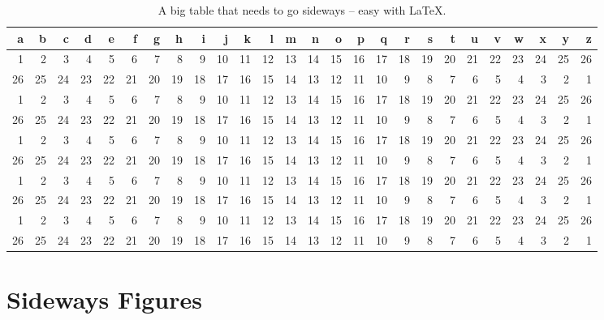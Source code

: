 \begin{table}
  \caption{\label{tbl:sidewaysT}A big table that needs to go
   sideways -- easy with \LaTeX.}

  \vspace{2ex}
  \renewcommand{\arraystretch}{1.2}
  \begin{tabular*}{\textwidth}{@{\extracolsep{\fill}}*{26}{r}}
    \hline\hline
    a & b & c & d & e & f & g & h & i & j & k & l & m & n & o &
     p & q & r & s & t & u & v & w & x & y & z
    \\ \hline
    1 & 2 & 3 & 4 & 5 & 6 & 7 & 8 & 9 &
    10 & 11 & 12 & 13 & 14 & 15 & 16 & 17 & 18 & 19 &
    20 & 21 & 22 & 23 & 24 & 25 & 26 \\
    26 & 25 & 24 & 23 & 22 & 21 & 20 &
    19 & 18 & 17 & 16 & 15 & 14 & 13 & 12 & 11 & 10 &
    9 & 8 & 7 & 6 & 5 & 4 & 3 & 2 & 1 \\
    1 & 2 & 3 & 4 & 5 & 6 & 7 & 8 & 9 &
    10 & 11 & 12 & 13 & 14 & 15 & 16 & 17 & 18 & 19 &
    20 & 21 & 22 & 23 & 24 & 25 & 26 \\
    26 & 25 & 24 & 23 & 22 & 21 & 20 &
    19 & 18 & 17 & 16 & 15 & 14 & 13 & 12 & 11 & 10 &
    9 & 8 & 7 & 6 & 5 & 4 & 3 & 2 & 1 \\
    1 & 2 & 3 & 4 & 5 & 6 & 7 & 8 & 9 &
    10 & 11 & 12 & 13 & 14 & 15 & 16 & 17 & 18 & 19 &
    20 & 21 & 22 & 23 & 24 & 25 & 26 \\
    26 & 25 & 24 & 23 & 22 & 21 & 20 &
    19 & 18 & 17 & 16 & 15 & 14 & 13 & 12 & 11 & 10 &
    9 & 8 & 7 & 6 & 5 & 4 & 3 & 2 & 1 \\
    1 & 2 & 3 & 4 & 5 & 6 & 7 & 8 & 9 &
    10 & 11 & 12 & 13 & 14 & 15 & 16 & 17 & 18 & 19 &
    20 & 21 & 22 & 23 & 24 & 25 & 26 \\
    26 & 25 & 24 & 23 & 22 & 21 & 20 &
    19 & 18 & 17 & 16 & 15 & 14 & 13 & 12 & 11 & 10 &
    9 & 8 & 7 & 6 & 5 & 4 & 3 & 2 & 1 \\
    1 & 2 & 3 & 4 & 5 & 6 & 7 & 8 & 9 &
    10 & 11 & 12 & 13 & 14 & 15 & 16 & 17 & 18 & 19 &
    20 & 21 & 22 & 23 & 24 & 25 & 26 \\
    26 & 25 & 24 & 23 & 22 & 21 & 20 &
    19 & 18 & 17 & 16 & 15 & 14 & 13 & 12 & 11 & 10 &
    9 & 8 & 7 & 6 & 5 & 4 & 3 & 2 & 1 \\
    \hline \hline
   \end{tabular*}
\end{table}

\section{Sideways Figures}

